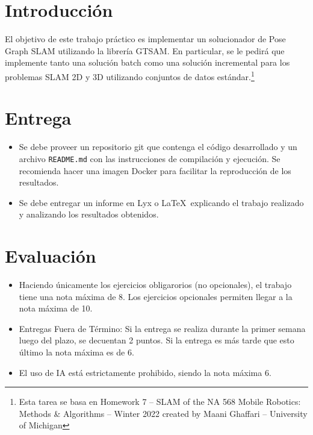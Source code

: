 \documentclass[tp]{lcc}
\begin{document}
\maketitle


\section{Introducción}
El objetivo de este trabajo práctico es implementar un solucionador de Pose Graph SLAM utilizando la librería GTSAM. En particular, se le pedirá que implemente tanto una solución batch como una solución incremental para los problemas SLAM 2D y 3D utilizando conjuntos de datos estándar.\footnote{Esta tarea se basa en Homework 7 -- SLAM of the NA 568 Mobile Robotics: Methods \& Algorithms -- Winter 2022 created by Maani Ghaffari -- University of Michigan}

\section*{Entrega}
	\begin{itemize}
        \item Se debe proveer un repositorio git que contenga el código desarrollado y un archivo \lstinline{README.md} con las instrucciones de compilación y ejecución. Se recomienda hacer una imagen Docker para facilitar la reproducción de los resultados.

        \item Se debe entregar un informe en Lyx o \LaTeX\  explicando el trabajo realizado y analizando los resultados obtenidos.
	\end{itemize}

\section*{Evaluación}
	\begin{itemize}
        \item Haciendo únicamente los ejercicios obligarorios (no opcionales), el trabajo tiene una nota máxima de 8. Los ejercicios opcionales permiten llegar a la nota máxima de 10.

        \item Entregas Fuera de Término: Si la entrega se realiza durante la primer semana luego del plazo, se decuentan 2 puntos. Si la entrega es más tarde que esto último la nota máxima es de 6.

        \item El uso de IA está estrictamente prohibido, siendo la nota máxima 6.
	\end{itemize}
\end{document}
